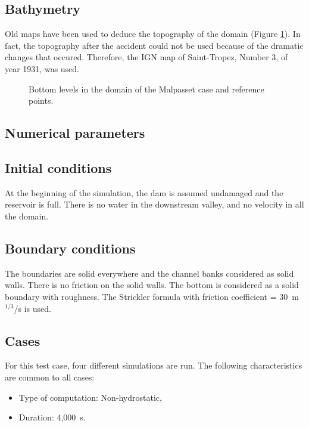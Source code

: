 \subsection{Bathymetry}
Old maps have been used to deduce the topography of the domain (Figure \ref{fig:malpasset:bathy}).
In fact, the topography after the accident could not be used because of the dramatic changes
that occured. Therefore, the IGN map of Saint-Tropez, Number 3, of year 1931, was used.

\begin{figure}[H]
  \centering
  \caption{Bottom levels in the domain of the Malpasset case and reference points.}
  \label{fig:malpasset:bathy}
\end{figure}

\subsection{Numerical parameters}

\subsection{Initial conditions}
At the beginning of the simulation, the dam is assumed undamaged and the reservoir is full. There is no water in the downstream valley, and no velocity in all the domain.
\subsection{Boundary conditions}
The boundaries are solid everywhere and the channel banks considered as solid walls. There is no friction on the solid walls. The bottom is considered as a solid boundary with roughness. The Strickler formula with friction coefficient = 30~m$^{1/3}$/s is used.

\subsection{Cases}
For this test case, four different simulations are run. The following characteristics are common to all cases:\\
\begin{itemize}
\itemsep0em
\item Type of computation: Non-hydrostatic,
\item Duration: 4,000~s.
\end{itemize}

